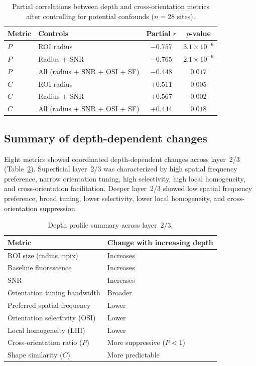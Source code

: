 \documentclass[11pt,letterpaper]{article}
\begin{document}
\begin{table}[tbp]
  \centering
  \caption{Partial correlations between depth and cross-orientation metrics
    after controlling for potential confounds ($n = 28$ sites).}
  \label{tab:controls}
  \begin{tabular}{llcc}
    \toprule
    Metric & Controls & Partial $r$ & $p$-value \\
    \midrule
    $P$ & ROI radius                     & $-0.757$ & $3.1 \times 10^{-6}$ \\
    $P$ & Radius + SNR                   & $-0.765$ & $2.1 \times 10^{-6}$ \\
    $P$ & All (radius + SNR + OSI + SF)  & $-0.448$ & $0.017$ \\
    $C$ & ROI radius                     & $+0.511$ & $0.005$ \\
    $C$ & Radius + SNR                   & $+0.567$ & $0.002$ \\
    $C$ & All (radius + SNR + OSI + SF)  & $+0.444$ & $0.018$ \\
    \bottomrule
  \end{tabular}
\end{table}


\subsection{Summary of depth-dependent changes}

Eight metrics showed coordinated depth-dependent changes across layer~2/3
(Table~\ref{tab:depth_profile}). Superficial layer~2/3 was characterized
by high spatial frequency preference, narrow orientation tuning, high
selectivity, high local homogeneity, and cross-orientation facilitation.
Deeper layer~2/3 showed low spatial frequency preference, broad tuning, lower
selectivity, lower local homogeneity, and cross-orientation suppression.

\begin{table}[tbp]
  \centering
  \caption{Depth profile summary across layer~2/3.}
  \label{tab:depth_profile}
  \begin{tabular}{ll}
    \toprule
    Metric & Change with increasing depth \\
    \midrule
    ROI size (radius, npix)         & Increases  \\
    Baseline fluorescence           & Increases  \\
    SNR                             & Increases  \\
    Orientation tuning bandwidth    & Broader    \\
    Preferred spatial frequency     & Lower      \\
    Orientation selectivity (OSI)   & Lower      \\
    Local homogeneity (LHI)         & Lower      \\
    Cross-orientation ratio ($P$) & More suppressive ($P < 1$) \\
    Shape similarity ($C$)          & More predictable \\
    \bottomrule
  \end{tabular}
\end{table}
\end{document}
